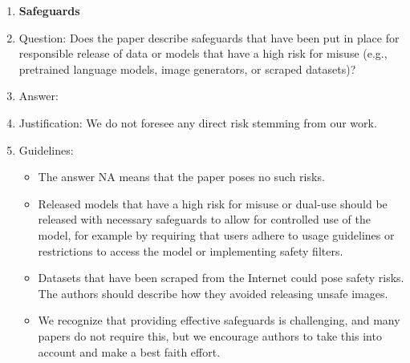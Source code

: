 \documentclass{article}
\theoremstyle{plain}
\theoremstyle{definition}
\theoremstyle{remark}
\theoremstyle{remark}
\begin{document}
\begin{enumerate}
\item {\bf Safeguards}
    \item[] Question: Does the paper describe safeguards that have been put in place for responsible release of data or models that have a high risk for misuse (e.g., pretrained language models, image generators, or scraped datasets)?
    \item[] Answer: \answerNA{} %
    \item[] Justification: We do not foresee any direct risk stemming from our work.
    \item[] Guidelines:
    \begin{itemize}
        \item The answer NA means that the paper poses no such risks.
        \item Released models that have a high risk for misuse or dual-use should be released with necessary safeguards to allow for controlled use of the model, for example by requiring that users adhere to usage guidelines or restrictions to access the model or implementing safety filters. 
        \item Datasets that have been scraped from the Internet could pose safety risks. The authors should describe how they avoided releasing unsafe images.
        \item We recognize that providing effective safeguards is challenging, and many papers do not require this, but we encourage authors to take this into account and make a best faith effort.
    \end{itemize}


\end{enumerate}
\end{document}

